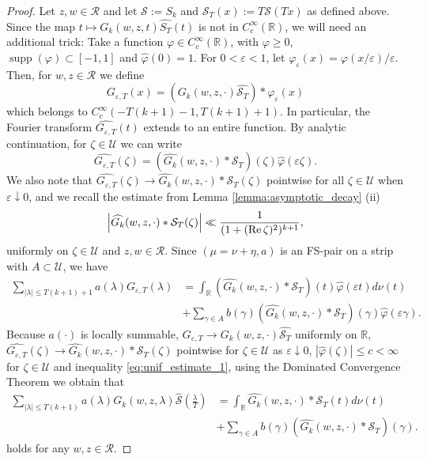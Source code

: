 \documentclass[a4paper,reqno,12pt]{amsart}
\DeclareMathOperator{\supp}{\mathrm{supp}}
\newcommand{\R}{\mathcal{R}}
\renewcommand{\S}{\mathcal{S}}
\newcommand{\U}{\mathcal{U}}
\renewcommand{\r}{\mathbb{R}}
\newcommand{\ft}{\widehat}
\newcommand{\la}{\lambda}
\newcommand{\ga}{\gamma}
\newcommand{\ep}{\varepsilon}
\newcommand{\p}{\varphi}
\newcommand{\cd}{\cdot}
\newcommand{\1}{{\bf 1}}
\newcommand{\ra}{\rightarrow}
\newcommand{\mt}{\mapsto}
\renewcommand{\Re}{{\rm Re}\,}
\begin{document}
\begin{proof}
Let $z,w\in\R$ and let $\S:=S_k$ and $\S_T(x):=T\S(Tx)$ as defined above. Since the map $t\mt G_k(w,z,t)\ft{S_T}(t)$ is not in $C^{\infty}_c(\r)$, we will need an additional trick: Take a function $\p\in C^\infty_c(\r)$, with $\p\geq0$, $\supp(\p)\subset[-1,1]$ and $\ft{\p}(0)=1$. For $0<\ep<1$, let $\p_\ep(x)=\p(x/\ep)/\ep$. Then, for $w,z\in\R$ we define
\begin{equation}
G_{\ep,T}(x)=\left(G_k(w,z,\cd)\ft{\S_T}\right)*\p_\ep(x)
\end{equation}
which belongs to $C^\infty_c(-T(k+1)-1,T(k+1)+1)$. In particular, the Fourier transform $\ft{G_{\ep,T}}(t)$ extends to an entire function. By analytic continuation, for $\zeta\in\U$ we can write
\begin{equation}
\ft{G_{\ep,T}}(\zeta)=\left(\ft{G_k}(w,z,\cd)* \S_T\right)(\zeta)\ft{\p}(\ep \zeta).
\end{equation}
We also note that $\ft{G_{\ep,T}}(\zeta)\ra\ft{G_k}(w,z,\cd)* \S_T(\zeta)$ pointwise for all $\zeta\in\U$ when $\ep\downarrow0$, and we recall the estimate from Lemma \ref{lemma:asymptotic_decay} (ii)
\begin{equation}
\label{eq:unif_estimate_1}
\left|\ft{G_k}(w,z,\cd)* \S_T(\zeta)\right|\ll\frac{1}{(1+(\Re{\zeta})^2)^{k+1}},
\end{equation}
uniformly on $\zeta\in\U$ and $z,w\in\R$. Since $(\mu=\nu+\eta,a)$ is an FS-pair on a strip with $A\subset\U$, we have
\begin{align}
\sum_{|\la|\leq T(k+1)+1} a(\la)G_{\ep,T}(\la)&=\int_{\r} \left(\ft{G_k}(w,z,\cd)* \S_T\right)(t)\ft{\p}(\ep t) d\nu(t)\\&+\sum_{\ga\in A} b(\ga)\left(\ft{G_k}(w,z,\cd)* \S_T\right)(\ga)\ft{\p}(\ep \ga).
\end{align}
Because $a(\cd)$ is locally summable, $G_{\ep,T}\ra G_k(w,z,\cd)\ft{\S_T}$ uniformly on $\r$, $\ft{G_{\ep,T}}(\zeta)\ra\ft{G_k}(w,z,\cd)* \S_T(\zeta)$ pointwise for $\zeta\in\U$ as $\ep\downarrow0$, $|\ft{\p}(\zeta)|\leq c<\infty$ for $\zeta\in\U$ and inequality \eqref{eq:unif_estimate_1}, using the Dominated Convergence Theorem we obtain that
\begin{align}
\label{eq:intermediate_bridge}
\sum_{|\la|\leq T(k+1)} a(\la)G_k(w,z,\la)\ft{\S}\left(\frac{\la}{T}\right)&=\int_{\r} \ft{G_k}(w,z,\cd)*\S_T(t)d\nu(t)\\
&+\sum_{\ga\in A} b(\ga)\left(\ft{G_k}(w,z,\cd)* \S_T\right)(\ga).
\end{align}
holds for any $w,z\in\R$.


\end{proof}
\end{document}
